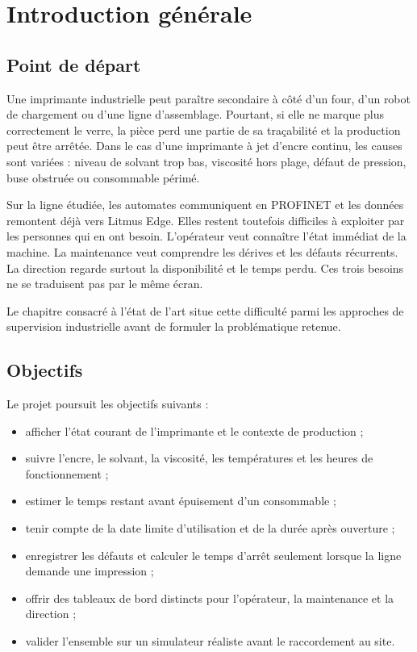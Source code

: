 \chapter{Introduction générale}

\section{Point de départ}

Une imprimante industrielle peut paraître secondaire à côté d'un four, d'un
robot de chargement ou d'une ligne d'assemblage. Pourtant, si elle ne marque
plus correctement le verre, la pièce perd une partie de sa traçabilité et la
production peut être arrêtée. Dans le cas d'une imprimante à jet d'encre
continu, les causes sont variées : niveau de solvant trop bas, viscosité hors
plage, défaut de pression, buse obstruée ou consommable périmé.

Sur la ligne étudiée, les automates communiquent en PROFINET et les données
remontent déjà vers Litmus Edge. Elles restent toutefois difficiles à
exploiter par les personnes qui en ont besoin. L'opérateur veut connaître
l'état immédiat de la machine. La maintenance veut comprendre les dérives et
les défauts récurrents. La direction regarde surtout la disponibilité et le
temps perdu. Ces trois besoins ne se traduisent pas par le même écran.

Le chapitre consacré à l'état de l'art situe cette difficulté parmi les
approches de supervision industrielle avant de formuler la problématique
retenue.

\section{Objectifs}

Le projet poursuit les objectifs suivants :

\begin{itemize}
  \item afficher l'état courant de l'imprimante et le contexte de production ;
  \item suivre l'encre, le solvant, la viscosité, les températures et les
        heures de fonctionnement ;
  \item estimer le temps restant avant épuisement d'un consommable ;
  \item tenir compte de la date limite d'utilisation et de la durée après
        ouverture ;
  \item enregistrer les défauts et calculer le temps d'arrêt seulement lorsque
        la ligne demande une impression ;
  \item offrir des tableaux de bord distincts pour l'opérateur, la maintenance
        et la direction ;
  \item valider l'ensemble sur un simulateur réaliste avant le raccordement au
        site.
\end{itemize}

